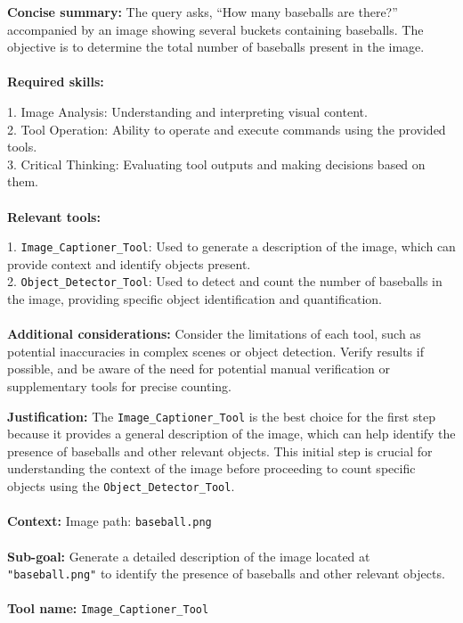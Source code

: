     \begin{plannerbox}
    
    \textbf{Concise summary:}
    The query asks, ``How many baseballs are there?'' accompanied by an image showing several buckets containing baseballs. The objective is to determine the total number of baseballs present in the image.
    \\\\
    \textbf{Required skills:}
    
    1. Image Analysis: Understanding and interpreting visual content. \\
    2. Tool Operation: Ability to operate and execute commands using the provided tools. \\
    3. Critical Thinking: Evaluating tool outputs and making decisions based on them.
    \\\\
    \textbf{Relevant tools:}
    
    1. \texttt{Image\_Captioner\_Tool}: Used to generate a description of the image, which can provide context and identify objects present. \\
    2. \texttt{Object\_Detector\_Tool}: Used to detect and count the number of baseballs in the image, providing specific object identification and quantification.
    \\\\
    \textbf{Additional considerations:}
    Consider the limitations of each tool, such as potential inaccuracies in complex scenes or object detection. Verify results if possible, and be aware of the need for potential manual verification or supplementary tools for precise counting.
    \end{plannerbox}
    
    
    \begin{plannerbox}
    
    \textbf{Justification:}
    The \texttt{Image\_Captioner\_Tool} is the best choice for the first step because it provides a general description of the image, which can help identify the presence of baseballs and other relevant objects. This initial step is crucial for understanding the context of the image before proceeding to count specific objects using the \texttt{Object\_Detector\_Tool}.
    \\\\
    \textbf{Context:}
    Image path: \texttt{baseball.png}
    \\\\
    \textbf{Sub-goal:}
    Generate a detailed description of the image located at \texttt{"baseball.png"} to identify the presence of baseballs and other relevant objects.
    \\\\
    \textbf{Tool name:} \texttt{Image\_Captioner\_Tool}
    \end{plannerbox}
    
